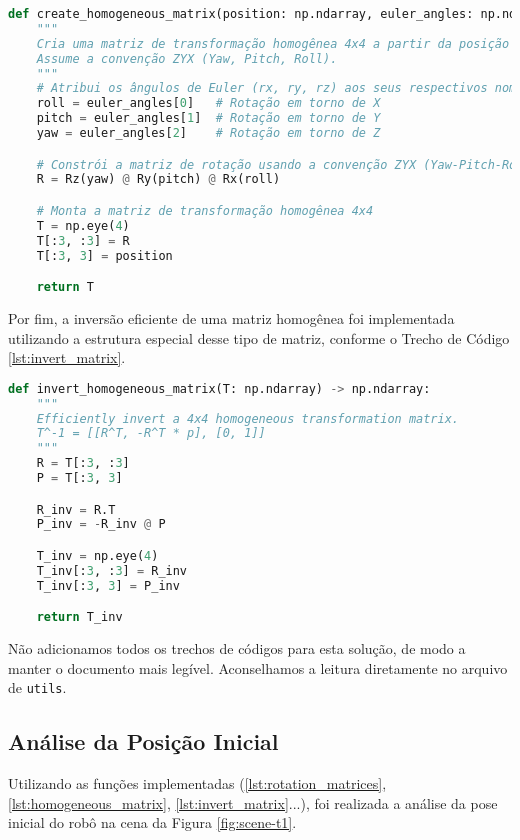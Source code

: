 \begin{lstlisting}[language=Python, caption=Função para criar matriz homogênea, label=lst:homogeneous_matrix]
def create_homogeneous_matrix(position: np.ndarray, euler_angles: np.ndarray) -> np.ndarray:
    """
    Cria uma matriz de transformação homogênea 4x4 a partir da posição e ângulos de Euler.
    Assume a convenção ZYX (Yaw, Pitch, Roll).
    """
    # Atribui os ângulos de Euler (rx, ry, rz) aos seus respectivos nomes
    roll = euler_angles[0]   # Rotação em torno de X
    pitch = euler_angles[1]  # Rotação em torno de Y
    yaw = euler_angles[2]    # Rotação em torno de Z

    # Constrói a matriz de rotação usando a convenção ZYX (Yaw-Pitch-Roll)
    R = Rz(yaw) @ Ry(pitch) @ Rx(roll)

    # Monta a matriz de transformação homogênea 4x4
    T = np.eye(4)
    T[:3, :3] = R
    T[:3, 3] = position

    return T
\end{lstlisting}

Por fim, a inversão eficiente de uma matriz homogênea foi implementada utilizando a estrutura especial desse tipo de matriz, conforme o Trecho de Código \ref{lst:invert_matrix}.

\begin{lstlisting}[language=Python, caption=Função para inverter matriz homogênea., label=lst:invert_matrix]
def invert_homogeneous_matrix(T: np.ndarray) -> np.ndarray:
    """
    Efficiently invert a 4x4 homogeneous transformation matrix.
    T^-1 = [[R^T, -R^T * p], [0, 1]]
    """
    R = T[:3, :3]
    P = T[:3, 3]

    R_inv = R.T
    P_inv = -R_inv @ P

    T_inv = np.eye(4)
    T_inv[:3, :3] = R_inv
    T_inv[:3, 3] = P_inv

    return T_inv
\end{lstlisting}

Não adicionamos todos os trechos de códigos para esta solução, de modo a manter o documento mais legível. Aconselhamos a leitura diretamente no arquivo de \texttt{utils}.

\subsection{Análise da Posição Inicial} \label{subsec:posicao-inicial}

Utilizando as funções implementadas (\ref{lst:rotation_matrices}, \ref{lst:homogeneous_matrix}, \ref{lst:invert_matrix}...),  foi realizada a análise da pose inicial do robô na cena da Figura \ref{fig:scene-t1}.

